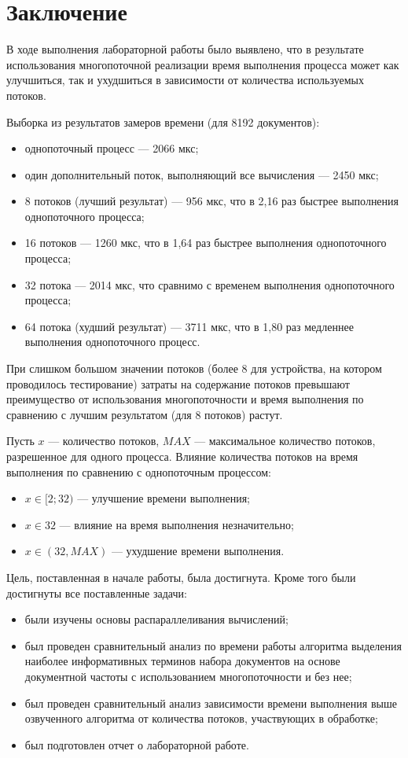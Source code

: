 \chapter*{Заключение}

В ходе выполнения лабораторной работы было выявлено, что в результате использования многопоточной реализации время выполнения процесса может как улучшиться, так и ухудшиться в зависимости от количества используемых потоков.

Выборка из результатов замеров времени (для 8192 документов):
\begin{itemize}
	\item однопоточный процесс --- 2066 мкс;
	\item один дополнительный поток, выполняющий все вычисления --- 2450 мкс;
	\item 8 потоков (лучший результат) --- 956 мкс, что в 2,16 раз быстрее выполнения однопоточного процесса;
	\item 16 потоков --- 1260 мкс, что в 1,64 раз быстрее выполнения однопоточного процесса;
	\item 32 потока  --- 2014 мкс, что сравнимо с временем выполнения однопоточного процесса;
	\item 64 потока (худший результат) --- 3711 мкс, что в 1,80 раз медленнее выполнения однопоточного процесс.
\end{itemize}

При слишком большом значении потоков (более 8 для устройства, на котором проводилось тестирование) затраты на содержание потоков превышают преимущество от использования многопоточности и время выполнения по сравнению с лучшим результатом (для 8 потоков) растут.

Пусть $x$ --- количество потоков, $MAX$ --- максимальное количество потоков, разрешенное для одного процесса.
Влияние количества потоков на время выполнения по сравнению с однопоточным процессом:
\begin{itemize}
	\item $x \in [2; 32)$ --- улучшение времени выполнения;
	\item $x \in {32}$  --- влияние на время выполнения незначительно;
	\item $x \in (32, MAX)$  --- ухудшение времени выполнения.
\end{itemize}

Цель, поставленная в начале работы, была достигнута. Кроме того были достигнуты все поставленные задачи:
\begin{itemize}
	\item были изучены основы распараллеливания вычислений;
	\item был проведен сравнительный анализ по времени работы алгоритма выделения наиболее информативных терминов набора документов на основе документной частоты с использованием многопоточности и без нее;
	\item был проведен сравнительный анализ зависимости времени выполнения выше озвученного алгоритма от количества потоков, участвующих в обработке;
	\item был подготовлен отчет о лабораторной работе.
\end{itemize}

